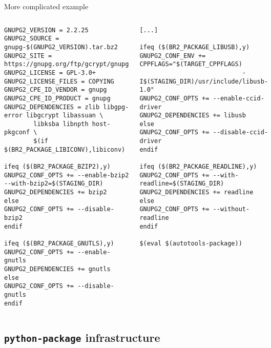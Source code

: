\begin{frame}[fragile]{More complicated  example}
  \begin{columns}
    \begin{block}{}
      \begin{verbatim}
GNUPG2_VERSION = 2.2.25
GNUPG2_SOURCE = gnupg-$(GNUPG2_VERSION).tar.bz2
GNUPG2_SITE = https://gnupg.org/ftp/gcrypt/gnupg
GNUPG2_LICENSE = GPL-3.0+
GNUPG2_LICENSE_FILES = COPYING
GNUPG2_CPE_ID_VENDOR = gnupg
GNUPG2_CPE_ID_PRODUCT = gnupg
GNUPG2_DEPENDENCIES = zlib libgpg-error libgcrypt libassuan \
        libksba libnpth host-pkgconf \
        $(if $(BR2_PACKAGE_LIBICONV),libiconv)

ifeq ($(BR2_PACKAGE_BZIP2),y)
GNUPG2_CONF_OPTS += --enable-bzip2 --with-bzip2=$(STAGING_DIR)
GNUPG2_DEPENDENCIES += bzip2
else
GNUPG2_CONF_OPTS += --disable-bzip2
endif

ifeq ($(BR2_PACKAGE_GNUTLS),y)
GNUPG2_CONF_OPTS += --enable-gnutls
GNUPG2_DEPENDENCIES += gnutls
else
GNUPG2_CONF_OPTS += --disable-gnutls
endif
\end{verbatim}
\end{block}
    \begin{block}{}
      \begin{verbatim}
[...]

ifeq ($(BR2_PACKAGE_LIBUSB),y)
GNUPG2_CONF_ENV += CPPFLAGS="$(TARGET_CPPFLAGS)
                            -I$(STAGING_DIR)/usr/include/libusb-1.0"
GNUPG2_CONF_OPTS += --enable-ccid-driver
GNUPG2_DEPENDENCIES += libusb
else
GNUPG2_CONF_OPTS += --disable-ccid-driver
endif

ifeq ($(BR2_PACKAGE_READLINE),y)
GNUPG2_CONF_OPTS += --with-readline=$(STAGING_DIR)
GNUPG2_DEPENDENCIES += readline
else
GNUPG2_CONF_OPTS += --without-readline
endif

$(eval $(autotools-package))
      \end{verbatim}
    \end{block}
  \end{columns}
\end{frame}

\subsection{{\tt python-package} infrastructure}

